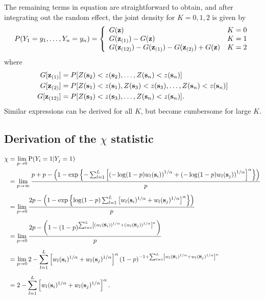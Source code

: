 \documentclass[11pt]{article}
\begin{document}
The remaining terms in equation  are straightforward to obtain, and after integrating out the random effect, the joint density for $K = 0, 1, 2$ is given by
\begin{align}\label{rbeq:pmf}
  P(Y_1=y_1,\ldots,Y_n=y_n) =  \left\{
    \begin{array}{ll}
      G(\mbox{\bf z}) & K=0 \\
      G(\mbox{\bf z}_{(1)})-G(\mbox{\bf z}) & K=1 \\
      G(\mbox{\bf z}_{(12)})-G(\mbox{\bf z}_{(1)})-G(\mbox{\bf z}_{(2)})+G(\mbox{\bf z}) & K=2
    \end{array}
  \right.
\end{align}
where
\begin{align*}
  G[\mbox{\bf z}_{(1)}] &= P[Z(\mbox{\bf s}_2)<z(\mbox{\bf s}_2),\ldots,Z(\mbox{\bf s}_n)<z(\mbox{\bf s}_n)] \\
  G[\mbox{\bf z}_{(2)}] &= P[Z(\mbox{\bf s}_1)<z(\mbox{\bf s}_1),Z(\mbox{\bf s}_3)<z(\mbox{\bf s}_3),\ldots,Z(\mbox{\bf s}_n)<z(\mbox{\bf s}_n)]\\
  G[\mbox{\bf z}_{(12)}] &= P[Z(\mbox{\bf s}_3)<z(\mbox{\bf s}_3),\ldots,Z(\mbox{\bf s}_n)<z(\mbox{\bf s}_n)].
\end{align*}
Similar expressions can be derived for all $K$, but become cumbersome for large $K$.

\subsection{Derivation of the $\chi$ statistic}\label{rba:chi}
\begin{align} \label{rbeq:chi}
  \chi &= \lim_{p \rightarrow 0 }\text{P}(Y_i = 1|Y_j = 1)\nonumber \\
   &= \lim_{p \rightarrow \infty }\frac{ p + p - \left( 1 - \exp \left \{ - \sum_{ l = 1 }^{ L } \left[ \left( -\log(1-p) w_{l}(\mbox{\bf s}_i) \right)^{ 1/\alpha } + \left( -\log(1 - p) w_{ l}(\mbox{\bf s}_j) \right)^{ 1/\alpha } \right]^{\alpha} \right \} \right) }{ p } \nonumber \\[0.5em]
  &= \lim_{p \rightarrow 0 } \frac{ 2p - \left( 1 - \exp \left \{ \log(1-p) \sum_{ l = 1 }^{ L } \left[  w_{l}(\mbox{\bf s}_i) ^{ 1/\alpha } +  w_{ l}(\mbox{\bf s}_j) ^{ 1/\alpha } \right]^{\alpha} \right \} \right) }{ p } \nonumber \\[0.5em]
  &= \lim_{p \rightarrow 0 } \frac{ 2p - \left( 1 - (1-p)^{ \sum_{ l = 1 }^{ L } \left[ \left( w_{l}(\mbox{\bf s}_i) \right)^{ 1/\alpha } + \left( w_{ l}(\mbox{\bf s}_j) \right)^{ 1/\alpha } \right]^\alpha } \right) }{ p } \nonumber \\[0.5em]
  &=\lim_{p \rightarrow 0 } 2 -\sum_{ l = 1 }^{ L } \left[ w_{l}(\mbox{\bf s}_i) ^{ 1/\alpha } +  w_{ l} (\mbox{\bf s}_j)^{ 1/\alpha } \right]^\alpha ( 1 - p)^{ -1 + \sum_{ l = 1 }^{ L } \left[  w_{l}(\mbox{\bf s}_i) ^{ 1/\alpha } +  w_{ l}(\mbox{\bf s}_j)^{ 1/\alpha } \right]^\alpha } \nonumber \\[0.5em]
  &= 2 -  \sum_{ l = 1 }^{ L } \left[ w_{l}(\mbox{\bf s}_i)^{ 1/\alpha } +  w_{ l}(\mbox{\bf s}_j) ^{ 1/\alpha } \right]^\alpha.
\end{align}
\end{document}
